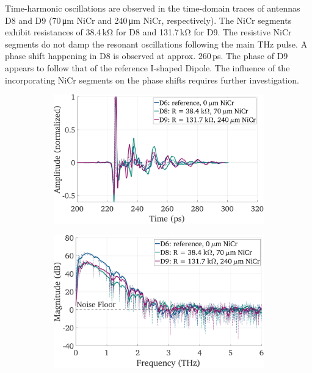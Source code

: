 Time-harmonic oscillations are observed in the time-domain traces of antennas D8 and D9 (\num{70}\,\si{\micro \meter} NiCr and \num{240}\,\si{\micro \meter} NiCr, respectively). The NiCr segments exhibit resistances of \num{38.4}\,\si{\kilo \ohm} for D8 and \num{131.7}\,\si{\kilo \ohm} for D9. The resistive NiCr segments do not damp the resonant oscillations following the main THz pulse. A phase shift happening in D8 is observed at approx. \num{260}\,\si{\pico \s}. The phase of D9 appears to follow that of the reference I-shaped Dipole. The influence of the incorporating NiCr segments on the phase shifts requires further investigation.


\begin{figure}[!]
    \centering
    \begin{subfigure}[b]{0.49\textwidth}
        \centering
        \includegraphics[height=0.6\textwidth]{figures/Results/mainTextComp/D6_D8_D9/D6_D8_D9_MA_time_norm.pdf}
        \caption{\centering}
        \label{comp_d6_d8_d9_time}
    \end{subfigure}
    \hfill
    \begin{subfigure}[b]{0.49\textwidth}
        \centering
        \includegraphics[height=0.6\textwidth]{figures/Results/mainTextComp/D6_D8_D9/D6_D8_D9_spectrum.pdf}

\end{subfigure}
\end{figure}
